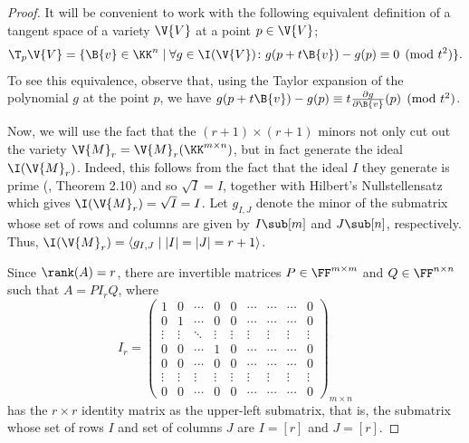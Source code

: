 \begin{proof}
	It will be convenient to work with the following equivalent definition of a tangent space of a variety $\V{V}$ at a point $p \in \V{V}$;
	$$\T_p\V{V} = \{ \B{v} \in \KK^n \mid \forall g \in \I(\V{V}) \colon g(p+t\B{v})-g(p) \equiv 0 \pmod{t^2}\}.$$
	To see this equivalence, observe that, using the Taylor expansion of the polynomial $g$ at the point $p$, we have 
	$g(p+t\B{v})-g(p) \equiv t\frac{\partial g}{\partial \B{v}}(p) \pmod{t^2}$.
	
	Now, we will use the fact that the $(r+1)\times(r+1)$ minors not only cut out the variety $\V{M}_r=\V{M}_r(\KK^{m\times n})$, but in fact generate the ideal $\I(\V{M}_r)$.
	Indeed, this follows from the fact that the ideal $I$ they generate is prime (\cite{BrunsVe}, Theorem 2.10) and so $\sqrt{I}=I$, together with Hilbert's Nullstellensatz which gives $\I(\V{M}_r)=\sqrt{I}=I$.
	Let $g_{I,J}$ denote the minor of the submatrix whose set of rows and columns are given by $I \sub [m]$ and $J \sub [n]$, respectively. 
	Thus, $\I(\V{M}_r) = \langle g_{I,J} \mid |I|=|J|=r+1 \rangle$.
	
	Since $\rank(A)=r$, there are invertible matrices $P \in \FF^{m\times m}$ and $Q \in \FF^{n \times n}$ such that $A=PI_rQ$, where 
	$$I_r = \begin{pmatrix}
		1 & 0 & \cdots & 0 & 0 & \cdots & \cdots & \cdots & 0 \\
		0 & 1 & \cdots & 0 & 0 & \cdots & \cdots & \cdots & 0 \\
		\vdots & \vdots & \ddots & \vdots & \vdots & \vdots & \vdots & \vdots & \vdots \\
		0 & 0 & \cdots & 1 & 0 & \cdots & \cdots & \cdots & 0 \\
		0 & 0 & \cdots & 0 & 0 & \cdots & \cdots & \cdots & 0\\
		\vdots  & \vdots & \vdots & \vdots & \vdots & \vdots & \vdots & \vdots & \vdots \\
		0 & 0 & \cdots & 0 & 0 & \cdots & \cdots & \cdots & 0
	\end{pmatrix}_{m \times n}$$
	has the $r \times r$ identity matrix as the upper-left submatrix, that is, the submatrix whose set of rows $I$ and set of columns $J$ are $I=[r]$ and $J=[r]$.
	

\end{proof}
